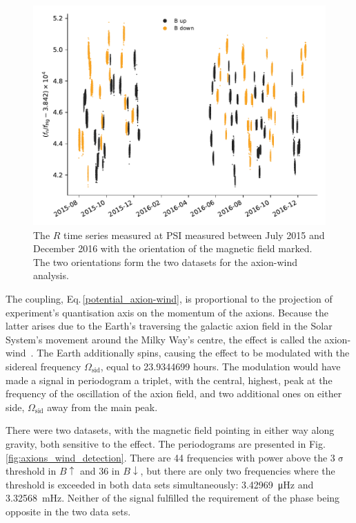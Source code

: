 \begin{figure}
  \centering
  \includegraphics[width=0.9\linewidth]{gfx/axions/wind_winddeltah4mm_time_domain_inset_no_yerr.pdf}
  \caption{The $R$ time series measured at PSI measured between July 2015 and December 2016 with the orientation of the magnetic field marked. The two orientations form the two datasets for the axion-wind analysis.}\label{fig:axions_wind_time_domain}
\end{figure}

The coupling, Eq.\,\ref{potential_axion-wind}, is proportional to the projection of experiment's quantisation axis on the momentum of the axions.
Because the latter arises due to the Earth's traversing the galactic axion field in the Solar System's movement around the Milky Way's centre, the effect is called the axion-wind~\cite{Stadnik2014A}.
The Earth additionally spins, causing the effect to be modulated with the sidereal frequency $\Omega_\text{sid}$, equal to \num[detect-all=true]{23.9344699} hours. 
The modulation would have made a signal in periodogram a triplet, with the central, highest, peak at the frequency of the oscillation of the axion field, and two additional ones on either side, $\Omega_\text{sid}$ away from the main peak.

There were two datasets, with the magnetic field pointing in either way along gravity, both sensitive to the effect. The periodograms are presented in Fig.\,\ref{fig:axions_wind_detection}. There are 44 frequencies with power above the 3$\upsigma$ threshold in $B\uparrow$ and 36 in $B\downarrow$, but there are only two frequencies where the threshold is exceeded in both data sets simultaneously: \SI{3.42969}{\micro\hertz} and \SI{3.32568}{\milli\hertz}. Neither of the signal fulfilled the requirement of the phase being opposite in the two data sets.

